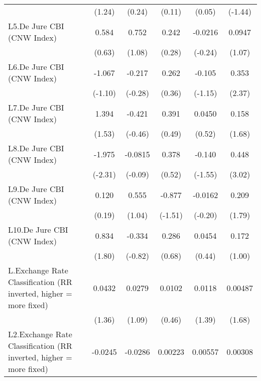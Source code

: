 {\begin{longtable}{l*{5}{c}}
                &   (1.24)         &   (0.24)         &   (0.11)         &   (0.05)         &  (-1.44)         \\
[1em]
L5.De Jure CBI (CNW Index)&    0.584         &    0.752         &    0.242         &  -0.0216         &   0.0947         \\
                &   (0.63)         &   (1.08)         &   (0.28)         &  (-0.24)         &   (1.07)         \\
[1em]
L6.De Jure CBI (CNW Index)&   -1.067         &   -0.217         &    0.262         &   -0.105         &    0.353\sym{*}  \\
                &  (-1.10)         &  (-0.28)         &   (0.36)         &  (-1.15)         &   (2.37)         \\
[1em]
L7.De Jure CBI (CNW Index)&    1.394         &   -0.421         &    0.391         &   0.0450         &    0.158         \\
                &   (1.53)         &  (-0.46)         &   (0.49)         &   (0.52)         &   (1.68)         \\
[1em]
L8.De Jure CBI (CNW Index)&   -1.975\sym{*}  &  -0.0815         &    0.378         &   -0.140         &    0.448\sym{**} \\
                &  (-2.31)         &  (-0.09)         &   (0.52)         &  (-1.55)         &   (3.02)         \\
[1em]
L9.De Jure CBI (CNW Index)&    0.120         &    0.555         &   -0.877         &  -0.0162         &    0.209         \\
                &   (0.19)         &   (1.04)         &  (-1.51)         &  (-0.20)         &   (1.79)         \\
[1em]
L10.De Jure CBI (CNW Index)&    0.834         &   -0.334         &    0.286         &   0.0454         &    0.172         \\
                &   (1.80)         &  (-0.82)         &   (0.68)         &   (0.44)         &   (1.00)         \\
[1em]
L.Exchange Rate Classification (RR inverted, higher = more fixed)&   0.0432         &   0.0279         &   0.0102         &   0.0118         &  0.00487         \\
                &   (1.36)         &   (1.09)         &   (0.46)         &   (1.39)         &   (1.68)         \\
[1em]
L2.Exchange Rate Classification (RR inverted, higher = more fixed)&  -0.0245         &  -0.0286         &  0.00223         &  0.00557         &  0.00308         \\

\end{longtable}}
